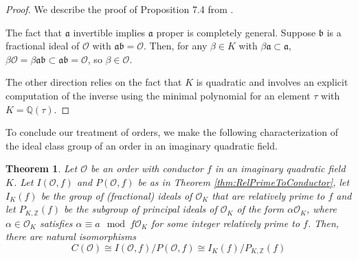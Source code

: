 \documentclass{amsart}
\newtheorem{thm}{Theorem}[section]
\theoremstyle{definition}
\theoremstyle{remark}
\numberwithin{equation}{section}
\newcommand{\cO}{\mathcal O}
\newcommand{\fka}{\mathfrak a}
\newcommand{\fkb}{\mathfrak b}
\newcommand{\bbQ}{\mathbb Q}
\newcommand{\bbZ}{\mathbb Z}
\begin{document}
 \begin{proof}
 We describe the proof of Proposition 7.4 from \cite{CoxPrimes}.
 
 The fact that $\fka$ invertible implies $\fka$ proper is completely general. Suppose $\fkb$ is a fractional ideal of $\cO$ with $\fka \fkb = \cO$. Then, for any $\beta \in K$ with $\beta \fka \subset \fka$, $\beta \cO = \beta \fka \fkb \subset \fka \fkb = \cO$, so $\beta \in \cO$.
 
 The other direction relies on the fact that $K$ is quadratic and involves an explicit computation of the inverse using the minimal polynomial for an element $\tau$ with $K = \bbQ(\tau)$.
 \end{proof}

To conclude our treatment of orders, we make the following characterization of the ideal class group of an order in an imaginary quadratic field.

\begin{thm} \label{thm:ICGInIQF}
Let $\cO$ be an order with conductor $f$ in an imaginary quadratic field $K$. Let $I(\cO, f)$ and $P(\cO, f)$ be as in Theorem \ref{thm:RelPrimeToConductor}, let $I_{K}(f)$ be the group of (fractional) ideals of $\cO_{K}$ that are relatively prime to $f$ and let $P_{K, \bbZ}(f)$ be the subgroup of principal ideals of $\cO_{K}$ of the form $\alpha \cO_{K}$, where $\alpha \in \cO_{K}$ satisfies $\alpha \equiv a \mod f \cO_{K}$ for some integer relatively prime to $f$. Then, there are natural isomorphisms
\[
 C(\cO) \cong I(\cO, f)/P(\cO, f) \cong I_{K}(f)/P_{K, \bbZ}(f)
\]
\end{thm}
\end{document}
